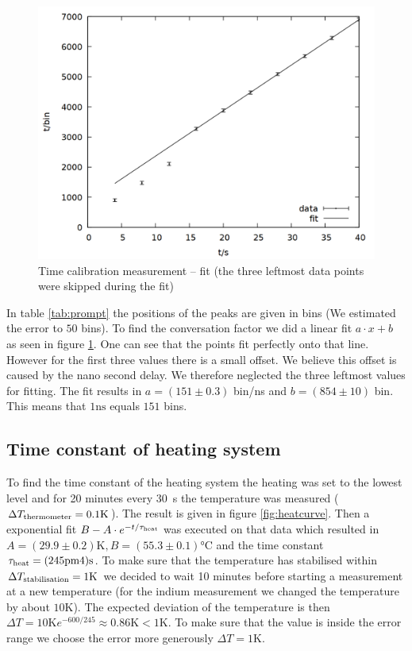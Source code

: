 \begin{figure}
\centering
\includegraphics[width=0.7\linewidth]{data/prompt/prompt_fit.png}
\caption{Time calibration measurement -- fit (the three leftmost data points were skipped during the fit)}
\label{fig:prompt_fit}
\end{figure}

In table \ref{tab:prompt} the positions of the peaks are given in bins (We estimated the error to $50$ bins). To find the conversation factor we did a linear fit $a\cdot x + b$ as seen in figure \ref{fig:prompt_fit}. One can see that the points fit perfectly onto that line. However for the first three values there is a small offset. We believe this offset is caused by the nano second delay. We therefore neglected the three leftmost values for fitting. The fit results in $a = (151 \pm 0.3)$ bin/ns and $b = (854 \pm 10)$ bin. This means that $\si{1 \nano\second}$ equals $151$ bins.

\subsection{Time constant of heating system}

To find the time constant of the heating system the heating was set to the lowest level and for 20 minutes every \SI{30}{\second} the temperature was measured ($\Delta T\ind{thermometer} = 0.1 \si{\kelvin}$). The result is given in figure \ref{fig:heatcurve}. Then a exponential fit $B - A \cdot e^{-t/\tau\ind{heat}}$ was executed on that data which resulted in $A = (29.9 \pm 0.2) \si{\kelvin}, B = (55.3\pm 0.1) \si{\celsius}$ and the time constant $\tau\ind{heat} = \si{(245 \pm 4) \second}$. To make sure that the temperature has stabilised within $\Delta T\ind{stabilisation} = 1 \si{\kelvin}$ we decided to wait 10 minutes before starting a measurement at a new temperature (for the indium measurement we changed the temperature by about $10 \si{\kelvin}$). The expected deviation of the temperature is then $\Delta T = 10 \si{\kelvin} e^{-600/245} \approx 0.86 \si{\kelvin} < 1 \si{\kelvin}$. To make sure that the value is inside the error range we choose the error more generously $\Delta T = 1 \si{\kelvin}$.

